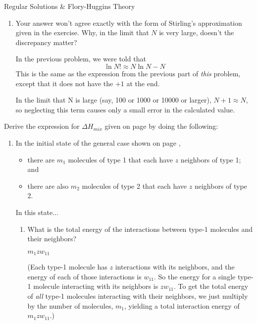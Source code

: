 \begin{activity}{Regular Solutions \& Flory-Huggins Theory}
\begin{exercises}
\begin{enumerate}
				\item Your answer won't agree exactly with the form of Stirling's approximation given in the exercise.  Why, in the limit that $N$ is very large, doesn't the discrepancy matter?
				
					\begin{solution}{}
						In the previous problem, we were told that
						\begin{equation*}
							\ln N! \approx N \ln N - N
						\end{equation*}
						This is the same as the expression from the previous part of \emph{this} problem, except that it does not have the $+1$ at the end.
						
						In the limit that N is large (say, 100 or 1000 or 10000 or larger), $N+1 \approx N$, so neglecting this term causes only a small error in the calculated value.
					\end{solution}
					
			\end{enumerate}
			
	\exercise Derive the expression for $\Delta H_{mix}$ given on page \pageref{\labelbase:eqn:Hmix} by doing the following: \label{\labelbase:exc:mixingenthalpy}
		
		\begin{enumerate}
		
		\item In the initial state of the general case shown on page \pageref{\labelbase:eqn:idealS}, 
		\begin{itemize}[itemsep=0pt,topsep=3pt]
			\item there are $m_1$ molecules of type 1 that each have $z$ neighbors of type 1; and
			\item there are also $m_2$ molecules of type 2 that each have $z$ neighbors of type 2.
		\end{itemize}
		In this state...
			
				\begin{enumerate} 
				
					\item What is the total energy of the interactions between type-1 molecules and their neighbors?
					
						\begin{solution}{}
							 $m_1 z w_{11}$
							 
							 (Each type-1 molecule has $z$ interactions with its neighbors, and the energy of each of those interactions is $w_{11}$.  So the energy for a single type-1 molecule interacting with its neighbors is $zw_{11}$.  To get the total energy of \emph{all} type-1 molecules interacting with their neighbors, we just multiply by the number of molecules, $m_1$, yielding a total interaction energy of $m_1 z w_{11}$.)
						\end{solution}
				

\end{enumerate}
\end{enumerate}
\end{exercises}
\end{activity}
